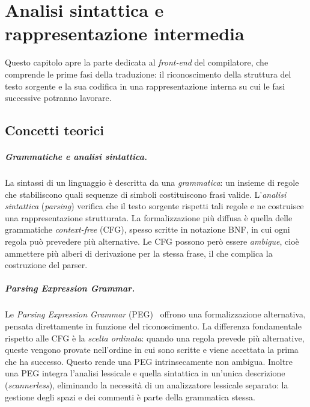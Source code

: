 
\chapter{Analisi sintattica e rappresentazione intermedia}
\label{cap:parsing}

Questo capitolo apre la parte dedicata al \emph{front-end} del compilatore, che
comprende le prime fasi della traduzione: il riconoscimento della struttura del
testo sorgente e la sua codifica in una rappresentazione interna su cui le fasi
successive potranno lavorare.

\section{Concetti teorici}
\label{sec:parsing-teoria}

\paragraph{Grammatiche e analisi sintattica.}
La sintassi di un linguaggio è descritta da una \emph{grammatica}: un insieme di
regole che stabiliscono quali sequenze di simboli costituiscono frasi valide.
L'\emph{analisi sintattica} (\emph{parsing}) verifica che il testo sorgente
rispetti tali regole e ne costruisce una rappresentazione strutturata. La
formalizzazione più diffusa è quella delle grammatiche \emph{context-free}
(CFG), spesso scritte in notazione BNF, in cui ogni regola può prevedere più
alternative. Le CFG possono però essere \emph{ambigue}, cioè ammettere più
alberi di derivazione per la stessa frase, il che complica la costruzione del
parser.

\paragraph{Parsing Expression Grammar.}
Le \emph{Parsing Expression Grammar} (PEG)~\cite{ford2004} offrono una
formalizzazione alternativa, pensata direttamente in funzione del
riconoscimento. La differenza fondamentale rispetto alle CFG è la \emph{scelta
ordinata}: quando una regola prevede più alternative, queste vengono provate
nell'ordine in cui sono scritte e viene accettata la prima che ha successo.
Questo rende una PEG intrinsecamente non ambigua. Inoltre una PEG integra
l'analisi lessicale e quella sintattica in un'unica descrizione
(\emph{scannerless}), eliminando la necessità di un analizzatore lessicale
separato: la gestione degli spazi e dei commenti è parte della grammatica
stessa.

